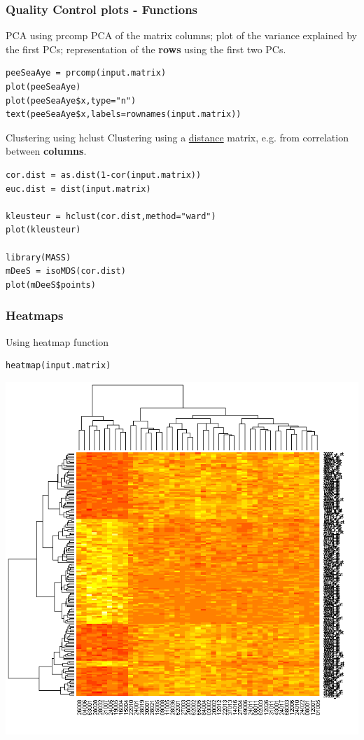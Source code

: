 \documentclass[10pt]{beamer}
\newenvironment{xframe}[2][]
  {\begin{frame}[fragile,environment=xframe,#1]
  \frametitle{#2}}
  {\end{frame}}
\begin{document}
\begin{xframe}[shrink=10]{Quality Control plots - Functions}
  \begin{block}{PCA using {\sf prcomp}}
    PCA of the matrix columns; plot of the variance explained by the first PCs; representation of the {\bf rows} using the first two PCs.
\begin{verbatim}
peeSeaAye = prcomp(input.matrix)
plot(peeSeaAye)
plot(peeSeaAye$x,type="n")
text(peeSeaAye$x,labels=rownames(input.matrix))
\end{verbatim}  
  \end{block}
  \begin{block}{Clustering using {\sf hclust}}
    Clustering using a \uline{distance} matrix, e.g. from correlation between {\bf columns}.
\begin{verbatim}
cor.dist = as.dist(1-cor(input.matrix))
euc.dist = dist(input.matrix)

kleusteur = hclust(cor.dist,method="ward")
plot(kleusteur)

library(MASS)
mDeeS = isoMDS(cor.dist)
plot(mDeeS$points)
\end{verbatim}  
  \end{block}
\end{xframe}


\begin{xframe}{Heatmaps}
  \centering
  \begin{block}{Using {\sf heatmap} function}
\begin{verbatim}
heatmap(input.matrix)
\end{verbatim}  
  \end{block}
  
  \includegraphics[height=.7\textheight]{imgs/heatmap-example.png}
  
\end{xframe}
\end{document}

